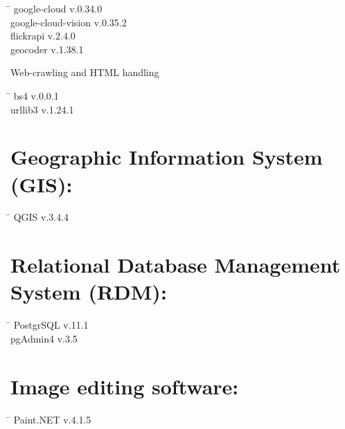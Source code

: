  \begin{tabbing}
  \hspace*{5cm}  \= \kill
  google-cloud \> v.0.34.0 \\
  google-cloud-vision \> v.0.35.2 \\
  flickrapi \> v.2.4.0 \\
  geocoder \> v.1.38.1
 \end{tabbing}
\begin{large}Web-crawling and HTML handling\end{large}
 \begin{tabbing}
  \hspace*{5cm}  \= \kill
   bs4 \> v.0.0.1 \\
   urllib3 \> v.1.24.1 \\
 \end{tabbing}
 
 \section*{Geographic Information System (GIS):}
  \begin{tabbing}
  \hspace*{5cm}  \= \kill
   QGIS \> v.3.4.4
 \end{tabbing}
 \section*{Relational Database Management System (RDM):}
  \begin{tabbing}
  \hspace*{5cm}  \= \kill
   PostgrSQL \> v.11.1 \\
   pgAdmin4 \> v.3.5
 \end{tabbing}
 
 \section*{Image editing software:}
  \begin{tabbing}
  \hspace*{5cm}  \= \kill
   Paint.NET \> v.4.1.5
 \end{tabbing}

 
 
 
 
 
 
 
 
 
 
 
 
 
 
 
 

